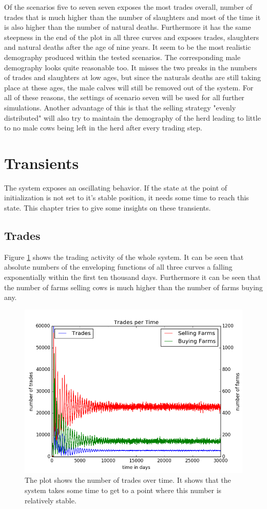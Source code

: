 Of the scenarios five to seven seven exposes the most trades overall, number of trades that is much higher than the number of slaughters and most of the time it is also higher than the number of natural deaths. Furthermore it has the same steepness in the end of the plot in all three curves and exposes trades, slaughters and natural deaths after the age of nine years. It seem to be the most realistic demography produced within the tested scenarios. The corresponding male demography looks quite reasonable too. It misses the two preaks in the numbers of trades and slaughters at low ages, but since the naturals deaths are still taking place at these ages, the male calves will still be removed out of the system. For all of these reasons, the settings of scenario seven will be used for all further simulations. Another advantage of this is that the selling strategy "evenly distributed" will also try to maintain the demography of the herd leading to little to no male cows being left in the herd after every trading step.
\section{Transients}
The system exposes an oscillating behavior. If the state at the point of initialization is not set to it's stable position, it needs some time to reach this state. This chapter tries to give some insights on these transients.
\subsection{Trades}
Figure \ref{fig:tradingTransients} shows the trading activity of the whole system. It can be seen that absolute numbers of the enveloping functions of all three curves a falling exponentially within the first ten thousand days. Furthermore it can be seen that the number of farms selling cows is much higher than the number of farms buying any. 
\begin{figure}[htbp]
\centering
\noindent\includegraphics[width=0.8\linewidth,height=\textheight,
keepaspectratio]{scen7tradingPlot.png} 
\caption[Transients In Trading]{The plot shows the number of trades over time. It shows that the system takes some time to get to a point where this number is relatively stable.}
\label{fig:tradingTransients}
\end{figure}


